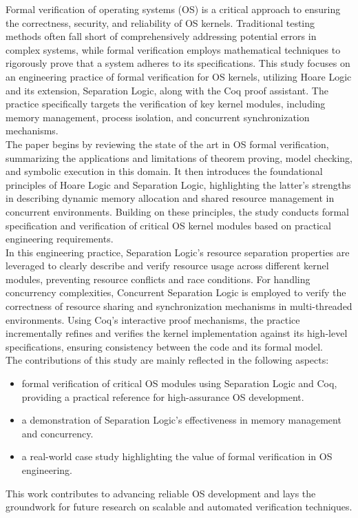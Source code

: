 \begin{eabstract}
\indent Formal verification of operating systems (OS) is a critical approach to ensuring the correctness, security, and reliability of OS kernels. Traditional testing methods often fall short of comprehensively addressing potential errors in complex systems, while formal verification employs mathematical techniques to rigorously prove that a system adheres to its specifications. This study focuses on an engineering practice of formal verification for OS kernels, utilizing Hoare Logic and its extension, Separation Logic, along with the Coq proof assistant. The practice specifically targets the verification of key kernel modules, including memory management, process isolation, and concurrent synchronization mechanisms.\\
\indent The paper begins by reviewing the state of the art in OS formal verification, summarizing the applications and limitations of theorem proving, model checking, and symbolic execution in this domain. It then introduces the foundational principles of Hoare Logic and Separation Logic, highlighting the latter's strengths in describing dynamic memory allocation and shared resource management in concurrent environments. Building on these principles, the study conducts formal specification and verification of critical OS kernel modules based on practical engineering requirements.\\
\indent In this engineering practice, Separation Logic's resource separation properties are leveraged to clearly describe and verify resource usage across different kernel modules, preventing resource conflicts and race conditions. For handling concurrency complexities, Concurrent Separation Logic is employed to verify the correctness of resource sharing and synchronization mechanisms in multi-threaded environments. Using Coq's interactive proof mechanisms, the practice incrementally refines and verifies the kernel implementation against its high-level specifications, ensuring consistency between the code and its formal model.\\
\indent The contributions of this study are mainly reflected in the following aspects:
\begin{itemize}
    \item formal verification of critical OS modules using Separation Logic and Coq, providing a practical reference for high-assurance OS development.
    \item a demonstration of Separation Logic's effectiveness in memory management and concurrency.
    \item a real-world case study highlighting the value of formal verification in OS engineering.
\end{itemize}
\indent This work contributes to advancing reliable OS development and lays the groundwork for future research on scalable and automated verification techniques.
\end{eabstract}

